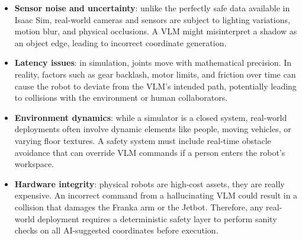 \begin{itemize}
	\item \textbf{Sensor noise and uncertainty}: unlike the perfectly safe data available in Isaac Sim, real-world cameras and sensors are subject to lighting variations, motion blur, and physical occlusions. A VLM might misinterpret a shadow as an object edge, leading to incorrect coordinate generation.
	
	\item \textbf{Latency issues}: in simulation, joints move with mathematical precision. In reality, factors such as gear backlash, motor limits, and friction over time can cause the robot to deviate from the VLM's intended path, potentially leading to collisions with the environment or human collaborators.
	
	\item \textbf{Environment dynamics}: while a simulator is a closed system, real-world deployments often involve dynamic elements like people, moving vehicles, or varying floor textures. A safety system must include real-time obstacle avoidance that can override VLM commands if a person enters the robot’s workspace.
	
	\item \textbf{Hardware integrity}: physical robots are high-cost assets, they are really expensive. An incorrect command from a hallucinating VLM could result in a collision that damages the Franka arm or the Jetbot. Therefore, any real-world deployment requires a deterministic safety layer to perform sanity checks on all AI-suggested coordinates before execution.
\end{itemize}